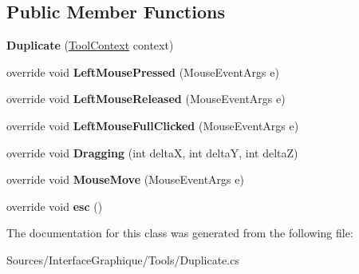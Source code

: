 \subsection*{Public Member Functions}
\begin{DoxyCompactItemize}
\item 
\hypertarget{class_interface_graphique_1_1_tools_1_1_duplicate_a5cfcc7ce5a31490ee9347ce121c9c7c4}{}{\bfseries Duplicate} (\hyperlink{class_interface_graphique_1_1_tools_1_1_tool_context}{Tool\+Context} context)\label{class_interface_graphique_1_1_tools_1_1_duplicate_a5cfcc7ce5a31490ee9347ce121c9c7c4}

\item 
\hypertarget{class_interface_graphique_1_1_tools_1_1_duplicate_ab3771a3f6ead534124feaf89f542a910}{}override void {\bfseries Left\+Mouse\+Pressed} (Mouse\+Event\+Args e)\label{class_interface_graphique_1_1_tools_1_1_duplicate_ab3771a3f6ead534124feaf89f542a910}

\item 
\hypertarget{class_interface_graphique_1_1_tools_1_1_duplicate_a23482008d3d07f80d4b5b9db77fd63c9}{}override void {\bfseries Left\+Mouse\+Released} (Mouse\+Event\+Args e)\label{class_interface_graphique_1_1_tools_1_1_duplicate_a23482008d3d07f80d4b5b9db77fd63c9}

\item 
\hypertarget{class_interface_graphique_1_1_tools_1_1_duplicate_a55a29f559ad9051390f107b34cd667a6}{}override void {\bfseries Left\+Mouse\+Full\+Clicked} (Mouse\+Event\+Args e)\label{class_interface_graphique_1_1_tools_1_1_duplicate_a55a29f559ad9051390f107b34cd667a6}

\item 
\hypertarget{class_interface_graphique_1_1_tools_1_1_duplicate_a92888a92cbdd84f7c617b82dde014c0f}{}override void {\bfseries Dragging} (int delta\+X, int delta\+Y, int delta\+Z)\label{class_interface_graphique_1_1_tools_1_1_duplicate_a92888a92cbdd84f7c617b82dde014c0f}

\item 
\hypertarget{class_interface_graphique_1_1_tools_1_1_duplicate_aa8bb7b1bf21dceacd60ac1a502c31a40}{}override void {\bfseries Mouse\+Move} (Mouse\+Event\+Args e)\label{class_interface_graphique_1_1_tools_1_1_duplicate_aa8bb7b1bf21dceacd60ac1a502c31a40}

\item 
\hypertarget{class_interface_graphique_1_1_tools_1_1_duplicate_a52769869afe558c10ec13bbc54d896f3}{}override void {\bfseries esc} ()\label{class_interface_graphique_1_1_tools_1_1_duplicate_a52769869afe558c10ec13bbc54d896f3}

\end{DoxyCompactItemize}


The documentation for this class was generated from the following file\+:\begin{DoxyCompactItemize}
\item 
Sources/\+Interface\+Graphique/\+Tools/Duplicate.\+cs\end{DoxyCompactItemize}
